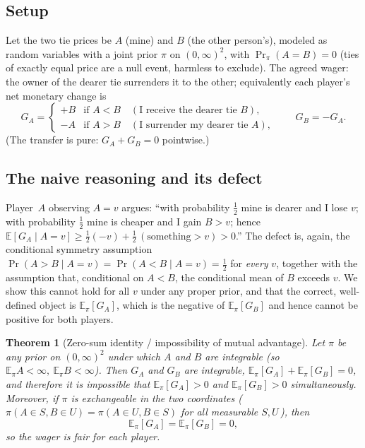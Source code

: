 \documentclass{amsart}
\theoremstyle{plain}
\newtheorem{theorem}{Theorem}
\theoremstyle{definition}
\begin{document}
\subsection{Setup} Let the two tie prices be $A$ (mine) and $B$ (the other
person's), modeled as random variables with a joint prior $\pi$ on
$(0,\infty)^2$, with $\Pr_\pi(A=B)=0$ (ties of exactly equal price are a null
event, harmless to exclude). The agreed wager: the owner of the dearer tie
surrenders it to the other; equivalently each player's net monetary change is
\begin{equation}\label{eq:tiepayoff}
G_A=\begin{cases} +B & \text{if }A<B\quad(\text{I receive the dearer tie } B),\\
-A & \text{if }A>B\quad(\text{I surrender my dearer tie } A),\end{cases}
\qquad G_B=-G_A .
\end{equation}
(The transfer is pure: $G_A+G_B=0$ pointwise.)

\subsection{The naive reasoning and its defect} Player~$A$ observing
$A=v$ argues: ``with probability $\tfrac12$ mine is dearer and I lose $v$; with
probability $\tfrac12$ mine is cheaper and I gain $B>v$; hence
$\mathbb E[G_A\mid A=v]\ge \tfrac12(-v)+\tfrac12\,(\text{something}>v)>0$.'' The
defect is, again, the conditional symmetry assumption
$\Pr(A>B\mid A=v)=\Pr(A<B\mid A=v)=\tfrac12$ for \emph{every} $v$, together with
the assumption that, conditional on $A<B$, the conditional mean of $B$ exceeds
$v$. We show this cannot hold for all $v$ under any proper prior, and that the
correct, well-defined object is $\mathbb E_\pi[G_A]$, which is the negative of
$\mathbb E_\pi[G_B]$ and hence cannot be positive for both players.

\begin{theorem}[Zero-sum identity / impossibility of mutual advantage]\label{thm:fubini}
Let $\pi$ be any prior on $(0,\infty)^2$ under which $A$ and $B$ are integrable
(so $\mathbb E_\pi A<\infty,\ \mathbb E_\pi B<\infty$). Then $G_A$ and $G_B$
are integrable, $\mathbb E_\pi[G_A]+\mathbb E_\pi[G_B]=0$, and therefore it is
impossible that $\mathbb E_\pi[G_A]>0$ and $\mathbb E_\pi[G_B]>0$ simultaneously.
Moreover, if $\pi$ is exchangeable in the two coordinates
(\,$\pi(A\in S,B\in U)=\pi(A\in U,B\in S)$ for all measurable $S,U$\,), then
\begin{equation}\label{eq:tiezero}
\mathbb E_\pi[G_A]=\mathbb E_\pi[G_B]=0 ,
\end{equation}
so the wager is fair for each player.
\end{theorem}
\end{document}
